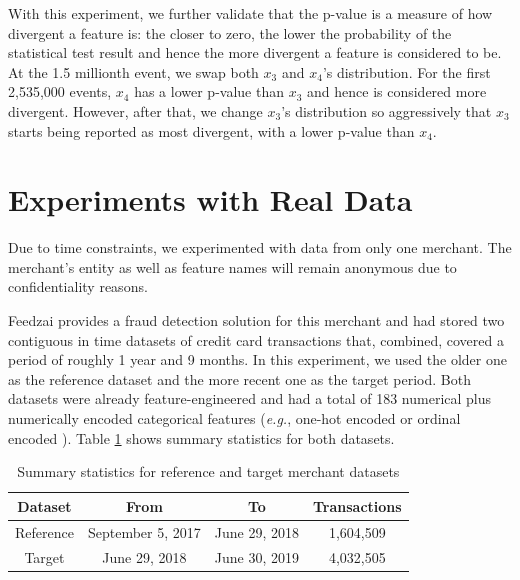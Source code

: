 \documentclass[sigconf]{acmart}
\begin{document}
With this experiment, we further validate that the p-value is a measure of how divergent a feature is: the closer to zero, the lower the probability of the statistical test result and hence the more divergent a feature is considered to be. At the 1.5 millionth event, we swap both $x_3$ and $x_4$'s distribution. For the first 2,535,000 events, $x_4$ has a lower p-value than $x_3$ and hence is considered more divergent. However, after that, we change $x_3$'s distribution so aggressively that $x_3$ starts being reported as most divergent, with a lower p-value than $x_4$.

\section{Experiments with Real Data}

Due to time constraints, we experimented with data from only one merchant. The merchant's entity as well as feature names will remain anonymous due to confidentiality reasons.

Feedzai provides a fraud detection solution for this merchant and had stored two contiguous in time datasets of credit card transactions that, combined, covered a period of roughly 1 year and 9 months. In this experiment, we used the older one as the reference dataset and the more recent one as the target period. Both datasets were already feature-engineered \cite{Domingos-ML-Feat-Eng} and had a total of 183 numerical plus numerically encoded categorical features (\textit{e.g.}, one-hot encoded or ordinal encoded \cite{categoricalencoding}). Table \ref{tbl:merchant1-datasets-summary} shows summary statistics for both datasets.
\begin{table}[!htb]
    \begin{center}
        \begin{tabular}{|c|c|c|c|}
        \hline
        \textbf{Dataset} & \textbf{From}              & \textbf{To}           & \multicolumn{1}{l|}{\textbf{Transactions}} \\ \hline
        Reference        & September 5, 2017 & June 29, 2018 & 1,604,509                                  \\ \hline
        Target           & June 29, 2018      & June 30, 2019 & 4,032,505                                  \\ \hline
        \end{tabular}
        \caption{Summary statistics for reference and target merchant datasets}
        \label{tbl:merchant1-datasets-summary}
    \end{center}
\end{table}
\end{document}
